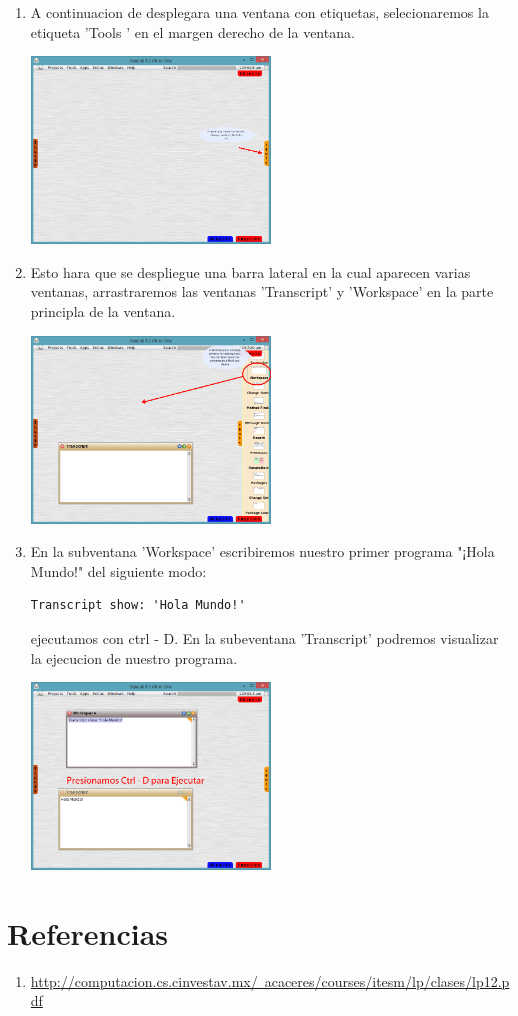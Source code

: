 \documentclass[11pt]{article}
\begin{document}
\begin{enumerate}
\item
A continuacion de desplegara una ventana con etiquetas, selecionaremos la etiqueta 'Tools ' en el margen derecho de la ventana.
				\begin{center}
				\includegraphics[width=0.5\textwidth]{images/tools}
				\end{center}
\item
Esto hara que se despliegue una barra lateral en la cual aparecen varias ventanas, arrastraremos las ventanas 'Transcript' y 'Workspace' en la parte principla de la ventana.
				\begin{center}
				\includegraphics[width=0.5\textwidth]{images/drag_tools}
				\end{center}
\item
En la subventana 'Workspace' escribiremos nuestro primer programa "¡Hola Mundo!" del siguiente modo:
\begin{lstlisting}
Transcript show: 'Hola Mundo!'
\end{lstlisting}
ejecutamos con ctrl - D. En la subeventana 'Transcript' podremos visualizar la ejecucion de nuestro programa.
				\begin{center}
				\includegraphics[width=0.5\textwidth]{images/executing}
				\end{center}



\end{enumerate}


\section{Referencias}
\begin{enumerate}
	\item \href{http://computacion.cs.cinvestav.mx/~acaceres/courses/itesm/lp/clases/lp12.pdf}{http://computacion.cs.cinvestav.mx/~acaceres/courses/itesm/lp/clases/lp12.pdf}
\end{enumerate}
\end{document}
